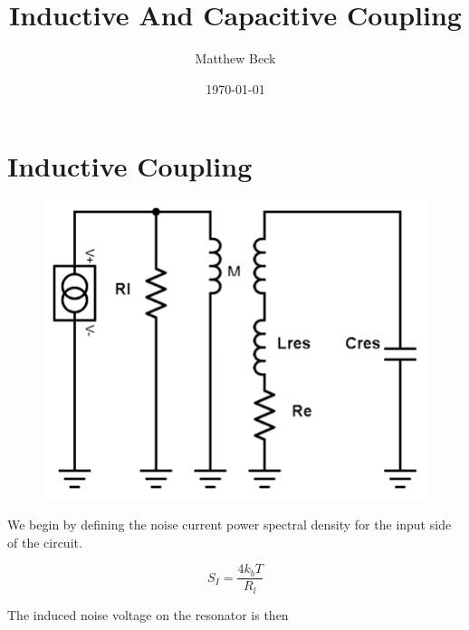 \documentclass[12pt,reqno]{amsart}
\title{Inductive And Capacitive Coupling}
\author{Matthew Beck}
\date{\today}
\begin{document}
\maketitle
\makenomenclature
\setlength{\parindent}{0pt}

\printnomenclature[6cm]

\section*{Inductive Coupling}

\begin{figure}[h!]
\begin{center}
\includegraphics[scale = 0.25]{Lcoupling.png}
\end{center}
\end{figure}

We begin by defining the noise current power spectral density for the input side of the circuit.

\begin{equation}
S_I = \frac{4k_bT}{R_l}
\label{LcoupSI}
\end{equation}

The induced noise voltage on the resonator is then
\end{document}
